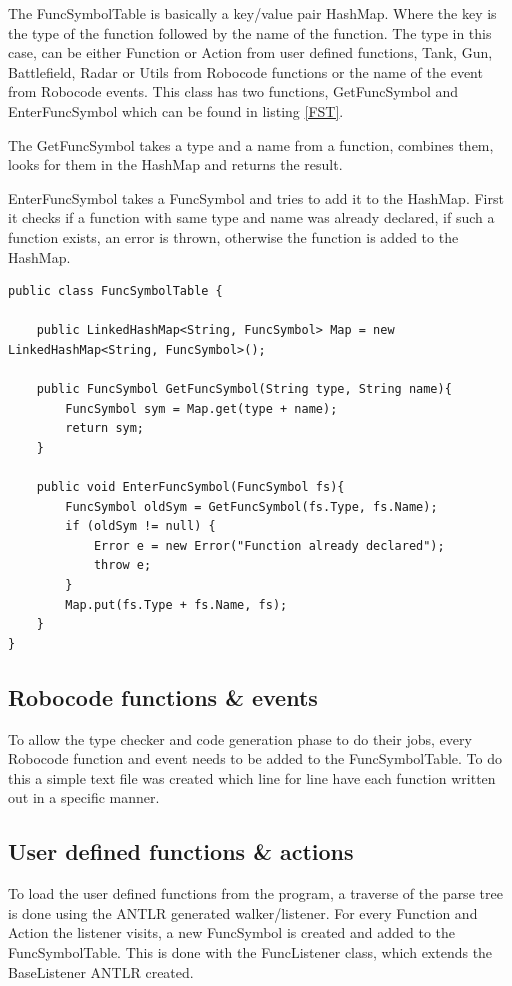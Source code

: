 The FuncSymbolTable is basically a key/value pair HashMap. Where the key is the type of the function followed by the name of the function. The type in this case, can be either Function or Action from user defined functions, Tank, Gun, Battlefield, Radar or Utils from Robocode functions or the name of the event from Robocode events.
This class has two functions, GetFuncSymbol and EnterFuncSymbol which can be found in listing \ref{FST}. 

The GetFuncSymbol takes a type and a name from a function, combines them, looks for them in the HashMap and returns the result.

EnterFuncSymbol takes a FuncSymbol and tries to add it to the HashMap. First it checks if a function with same type and name was already declared, if such a function exists, an error is thrown, otherwise the function is added to the HashMap.

\begin{lstlisting}[caption={FuncSymbolTable}, label={FST}]
public class FuncSymbolTable {

	public LinkedHashMap<String, FuncSymbol> Map = new LinkedHashMap<String, FuncSymbol>();

	public FuncSymbol GetFuncSymbol(String type, String name){
    	FuncSymbol sym = Map.get(type + name);
    	return sym;
	}

	public void EnterFuncSymbol(FuncSymbol fs){
    	FuncSymbol oldSym = GetFuncSymbol(fs.Type, fs.Name);
    	if (oldSym != null) {
        	Error e = new Error("Function already declared");
        	throw e;
    	}
    	Map.put(fs.Type + fs.Name, fs);
	}
}
\end{lstlisting}

\subsection{Robocode functions \& events}
To allow the type checker and code generation phase to do their jobs, every Robocode function and event needs to be added to the FuncSymbolTable. To do this a simple text file was created which line for line have each function written out in a specific manner. 

\subsection{User defined functions \& actions}
To load the user defined functions from the program, a traverse of the parse tree is done using the ANTLR generated walker/listener. For every Function and Action the listener visits, a new FuncSymbol is created and added to the FuncSymbolTable. This is done with the FuncListener class, which extends the BaseListener ANTLR created.
 
